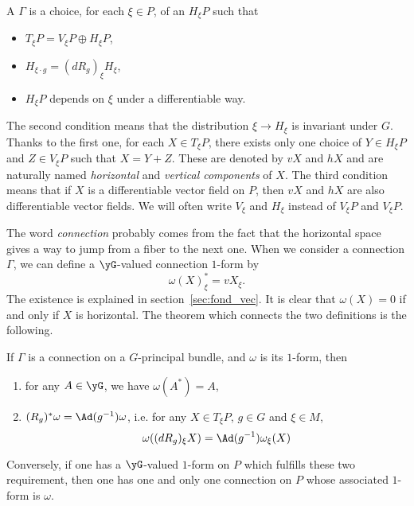 A  $\Gamma$ is a choice, for each $\xi\in P$, of an  $H_{\xi} P$ such that

\begin{itemize}
	\item $T_{\xi} P=V_{\xi} P\oplus H_{\xi} P$,
	\item $H_{\xi\cdot g}=(dR_g)_{\xi} H_{\xi}$,
	\item $H_{\xi} P$ depends on $\xi$ under a differentiable way.
\end{itemize}
The second condition means that the distribution $\xi\to H_{\xi}$ is invariant under $G$. Thanks to the first one, for each $X\in T_{\xi} P$, there exists only one choice of $Y\in H_{\xi} P$ and $Z\in V_{\xi} P$ such that $X=Y+Z$. These are denoted by $vX$ and $hX$ and are naturally named \emph{horizontal} and \emph{vertical components} of $X$. The third condition means that if $X$ is a differentiable vector field on $P$, then $vX$ and $hX$ are also differentiable vector fields. We will often write $V_{\xi}$ and $H_{\xi}$ instead of $V_{\xi} P$ and $V_{\xi} P$.

The word \emph{connection} probably comes from the fact that the horizontal space gives a way to jump from a fiber to the next one.
When we consider a connection $\Gamma$, we can define a $\yG$-valued connection $1$-form by
\[
	\omega(X)^*_{\xi}=vX_{\xi}.
\]
The existence is explained in section~\ref{sec:fond_vec}. It is clear that $\omega(X)=0$ if and only if $X$ is horizontal. The theorem which connects the two definitions is the following.

\begin{theorem}
	If $\Gamma$ is a connection on a $G$-principal bundle, and $\omega$ is its $1$-form, then

	\begin{enumerate}
		\item\label{enuyai} for any $A\in\yG$, we have $\omega(A^*)=A$,
		\item\label{enuyaii} $(R_g)^*\omega=\Ad(g^{-1})\omega$, i.e. for any $X\in T_{\xi} P$, $g\in G$ and $\xi\in M$,
		\[
			\omega((dR_g)_{\xi} X)=\Ad(g^{-1})\omega_{\xi}(X)
		\]
	\end{enumerate}
	Conversely, if one has a $\yG$-valued $1$-form on $P$ which fulfills these two requirement, then one has one and only one connection on $P$ whose associated $1$-form is $\omega$.

\end{theorem}

